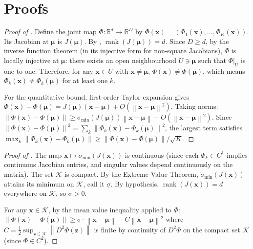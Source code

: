 \documentclass{article}
\newcommand{\R}{\mathbb{R}}
\newcommand{\norm}[1]{\left\lVert#1\right\rVert}
\DeclareMathOperator{\rank}{rank}
\begin{document}
\newpage
\appendix

\section{Proofs}
\label{app:proofs}

\begin{proof}[Proof of ]
Define the joint map $\Phi: \R^d \to \R^D$ by $\Phi(\mathbf{x}) = (\Phi_1(\mathbf{x}), \ldots, \Phi_K(\mathbf{x}))$. Its Jacobian at $\bm{\mu}$ is $J(\bm{\mu})$. By , $\rank(J(\bm{\mu})) = d$. Since $D \geq d$, by the inverse function theorem (in its injective form for non-square Jacobians), $\Phi$ is locally injective at $\bm{\mu}$: there exists an open neighbourhood $U \ni \bm{\mu}$ such that $\Phi|_U$ is one-to-one. Therefore, for any $\mathbf{x} \in U$ with $\mathbf{x} \neq \bm{\mu}$, $\Phi(\mathbf{x}) \neq \Phi(\bm{\mu})$, which means $\Phi_k(\mathbf{x}) \neq \Phi_k(\bm{\mu})$ for at least one $k$.

For the quantitative bound, first-order Taylor expansion gives $\Phi(\mathbf{x}) - \Phi(\bm{\mu}) = J(\bm{\mu})(\mathbf{x} - \bm{\mu}) + O(\norm{\mathbf{x}-\bm{\mu}}^2)$. Taking norms: $\norm{\Phi(\mathbf{x}) - \Phi(\bm{\mu})} \geq \sigma_{\min}(J(\bm{\mu})) \norm{\mathbf{x} - \bm{\mu}} - O(\norm{\mathbf{x}-\bm{\mu}}^2)$. Since $\norm{\Phi(\mathbf{x}) - \Phi(\bm{\mu})}^2 = \sum_k \norm{\Phi_k(\mathbf{x}) - \Phi_k(\bm{\mu})}^2$, the largest term satisfies $\max_k \norm{\Phi_k(\mathbf{x}) - \Phi_k(\bm{\mu})} \geq \norm{\Phi(\mathbf{x}) - \Phi(\bm{\mu})}/\sqrt{K}$.
\end{proof}

\begin{proof}[Proof of ]
The map $\mathbf{x} \mapsto \sigma_{\min}(J(\mathbf{x}))$ is continuous (since each $\Phi_k \in C^1$ implies continuous Jacobian entries, and singular values depend continuously on the matrix). The set $\mathcal{K}$ is compact. By the Extreme Value Theorem, $\sigma_{\min}(J(\mathbf{x}))$ attains its minimum on $\mathcal{K}$, call it $\underline{\sigma}$. By hypothesis, $\rank(J(\mathbf{x})) = d$ everywhere on $\mathcal{K}$, so $\underline{\sigma} > 0$.

For any $\mathbf{x} \in \mathcal{K}$, by the mean value inequality applied to $\Phi$:
$\norm{\Phi(\mathbf{x}) - \Phi(\bm{\mu})} \geq \underline{\sigma} \cdot \norm{\mathbf{x} - \bm{\mu}} - C\norm{\mathbf{x}-\bm{\mu}}^2$
where $C = \frac{1}{2}\sup_{\mathbf{z} \in \mathcal{K}} \norm{D^2\Phi(\mathbf{z})}$ is finite by continuity of $D^2\Phi$ on the compact set $\mathcal{K}$ (since $\Phi \in C^2$).
\end{proof}
\end{document}
